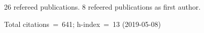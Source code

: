 26 refereed publications. 8 refeered publications as first author.

Total citations~=~641; h-index~=~13 (2019-05-08)